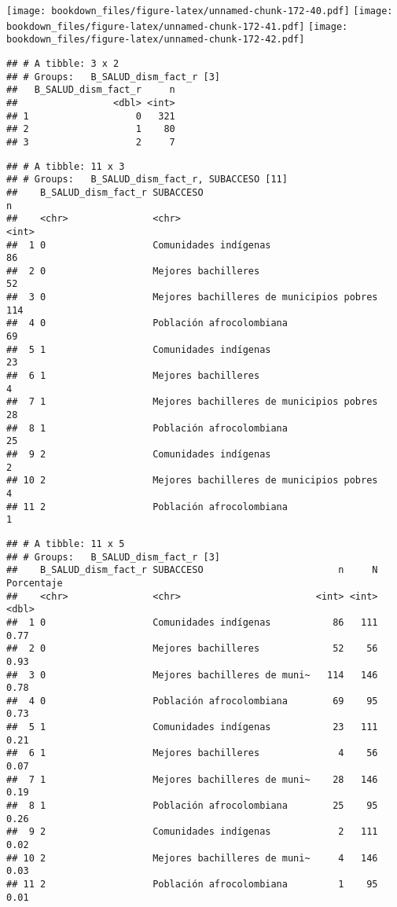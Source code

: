 \documentclass[]{article}
\theoremstyle{definition}
\theoremstyle{definition}
\theoremstyle{definition}
\theoremstyle{remark}
\begin{document}
\texttt{[image: bookdown\_files/figure-latex/unnamed-chunk-172-40.pdf]}
\texttt{[image: bookdown\_files/figure-latex/unnamed-chunk-172-41.pdf]}
\texttt{[image: bookdown\_files/figure-latex/unnamed-chunk-172-42.pdf]}

\begin{verbatim}
## # A tibble: 3 x 2
## # Groups:   B_SALUD_dism_fact_r [3]
##   B_SALUD_dism_fact_r     n
##                 <dbl> <int>
## 1                   0   321
## 2                   1    80
## 3                   2     7
\end{verbatim}

\begin{verbatim}
## # A tibble: 11 x 3
## # Groups:   B_SALUD_dism_fact_r, SUBACCESO [11]
##    B_SALUD_dism_fact_r SUBACCESO                                    n
##    <chr>               <chr>                                    <int>
##  1 0                   Comunidades indígenas                       86
##  2 0                   Mejores bachilleres                         52
##  3 0                   Mejores bachilleres de municipios pobres   114
##  4 0                   Población afrocolombiana                    69
##  5 1                   Comunidades indígenas                       23
##  6 1                   Mejores bachilleres                          4
##  7 1                   Mejores bachilleres de municipios pobres    28
##  8 1                   Población afrocolombiana                    25
##  9 2                   Comunidades indígenas                        2
## 10 2                   Mejores bachilleres de municipios pobres     4
## 11 2                   Población afrocolombiana                     1
\end{verbatim}

\begin{verbatim}
## # A tibble: 11 x 5
## # Groups:   B_SALUD_dism_fact_r [3]
##    B_SALUD_dism_fact_r SUBACCESO                        n     N Porcentaje
##    <chr>               <chr>                        <int> <int>      <dbl>
##  1 0                   Comunidades indígenas           86   111       0.77
##  2 0                   Mejores bachilleres             52    56       0.93
##  3 0                   Mejores bachilleres de muni~   114   146       0.78
##  4 0                   Población afrocolombiana        69    95       0.73
##  5 1                   Comunidades indígenas           23   111       0.21
##  6 1                   Mejores bachilleres              4    56       0.07
##  7 1                   Mejores bachilleres de muni~    28   146       0.19
##  8 1                   Población afrocolombiana        25    95       0.26
##  9 2                   Comunidades indígenas            2   111       0.02
## 10 2                   Mejores bachilleres de muni~     4   146       0.03
## 11 2                   Población afrocolombiana         1    95       0.01
\end{verbatim}
\end{document}
